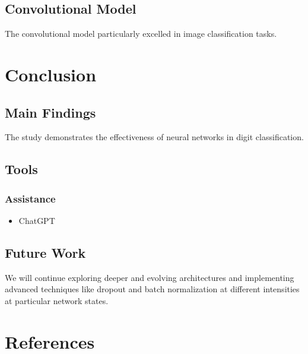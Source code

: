\documentclass{article}
\begin{document}
\subsection{Convolutional Model}
The convolutional model particularly excelled in 
image classification tasks.
\section{Conclusion}
\subsection{Main Findings}
The study demonstrates the effectiveness of 
neural networks in digit classification. 
\subsection{Tools}
\subsubsection{Assistance}
\begin{itemize}
    \item ChatGPT
\end{itemize}
\subsection{Future Work}
We will continue exploring 
deeper and evolving architectures and 
implementing advanced techniques like 
dropout and batch normalization at different intensities
at particular network states.


\section{References}

\end{document}
